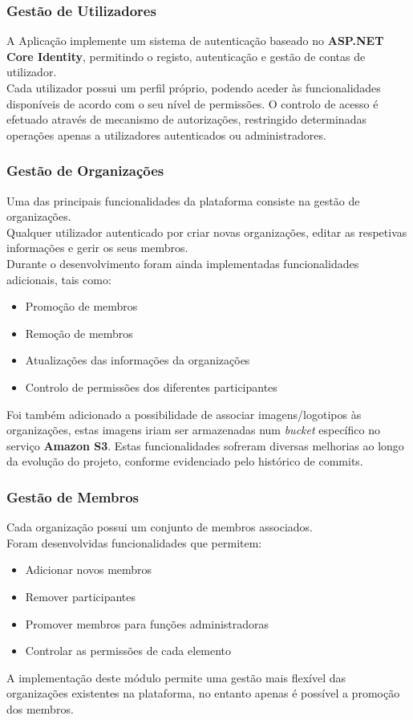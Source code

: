 \documentclass[12pt]{article}
\begin{document}
\subsubsection{Gestão de Utilizadores}
A Aplicação implemente um sistema de autenticação baseado no \textbf{ASP.NET Core Identity}, permitindo o registo, autenticação e gestão de contas de utilizador.\\
Cada utilizador possui um perfil próprio, podendo aceder às funcionalidades disponíveis de acordo com o seu nível de permissões. O controlo de acesso é efetuado através de mecanismo de autorizações, restringido determinadas operações apenas a utilizadores autenticados ou administradores.
\subsubsection{Gestão de Organizações}
Uma das principais funcionalidades da plataforma consiste na gestão de organizações.\\
Qualquer utilizador autenticado por criar novas organizações, editar as respetivas informações e gerir os seus membros.\\
Durante o desenvolvimento foram ainda implementadas funcionalidades adicionais, tais como:
\begin{itemize}
    \item Promoção de membros
    \item Remoção de membros
    \item Atualizações das informações da organizações
    \item Controlo de permissões dos diferentes participantes
\end{itemize}
Foi também adicionado a possibilidade de associar imagens/logotipos às organizações, estas imagens iriam ser armazenadas num \emph{bucket} específico no serviço \textbf{Amazon S3}.
Estas funcionalidades sofreram diversas melhorias ao longo da evolução do projeto, conforme evidenciado pelo histórico de commits.
\subsubsection{Gestão de Membros}
Cada organização possui um conjunto de membros associados.\\
Foram desenvolvidas funcionalidades que permitem:
\begin{itemize}
    \item Adicionar novos membros
    \item Remover participantes
    \item Promover membros para funções administradoras
    \item Controlar as permissões de cada elemento
\end{itemize}
A implementação deste módulo permite uma gestão mais flexível das organizações existentes na plataforma, no entanto apenas é possível a promoção dos membros.
\end{document}

